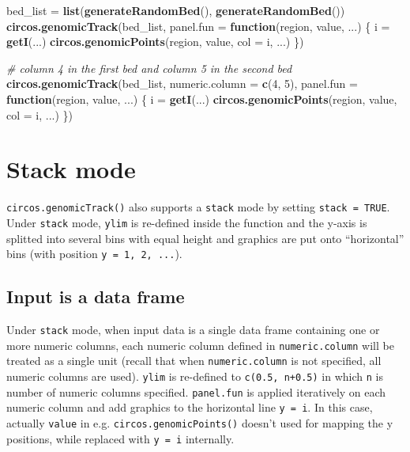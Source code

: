 \documentclass[]{book}
\newenvironment{Shaded}{\begin{snugshade}}{\end{snugshade}}
\newcommand{\KeywordTok}[1]{\textcolor[rgb]{0.13,0.29,0.53}{\textbf{#1}}}
\newcommand{\DataTypeTok}[1]{\textcolor[rgb]{0.13,0.29,0.53}{#1}}
\newcommand{\DecValTok}[1]{\textcolor[rgb]{0.00,0.00,0.81}{#1}}
\newcommand{\StringTok}[1]{\textcolor[rgb]{0.31,0.60,0.02}{#1}}
\newcommand{\CommentTok}[1]{\textcolor[rgb]{0.56,0.35,0.01}{\textit{#1}}}
\newcommand{\ControlFlowTok}[1]{\textcolor[rgb]{0.13,0.29,0.53}{\textbf{#1}}}
\newcommand{\NormalTok}[1]{#1}
\begin{document}
\begin{Shaded}
\begin{Highlighting}[]
\NormalTok{bed_list =}\StringTok{ }\KeywordTok{list}\NormalTok{(}\KeywordTok{generateRandomBed}\NormalTok{(), }\KeywordTok{generateRandomBed}\NormalTok{())}
\KeywordTok{circos.genomicTrack}\NormalTok{(bed_list,}
    \DataTypeTok{panel.fun =} \ControlFlowTok{function}\NormalTok{(region, value, ...) \{}
\NormalTok{        i =}\StringTok{ }\KeywordTok{getI}\NormalTok{(...)}
        \KeywordTok{circos.genomicPoints}\NormalTok{(region, value, }\DataTypeTok{col =}\NormalTok{ i, ...)}
\NormalTok{\})}

\CommentTok{# column 4 in the first bed and column 5 in the second bed}
\KeywordTok{circos.genomicTrack}\NormalTok{(bed_list, }\DataTypeTok{numeric.column =} \KeywordTok{c}\NormalTok{(}\DecValTok{4}\NormalTok{, }\DecValTok{5}\NormalTok{),}
    \DataTypeTok{panel.fun =} \ControlFlowTok{function}\NormalTok{(region, value, ...) \{}
\NormalTok{        i =}\StringTok{ }\KeywordTok{getI}\NormalTok{(...)}
        \KeywordTok{circos.genomicPoints}\NormalTok{(region, value, }\DataTypeTok{col =}\NormalTok{ i, ...)}
\NormalTok{\})}
\end{Highlighting}
\end{Shaded}

\section{Stack mode}\label{stack-mode}

\texttt{circos.genomicTrack()} also supports a \texttt{stack} mode by
setting \texttt{stack\ =\ TRUE}. Under \texttt{stack} mode,
\texttt{ylim} is re-defined inside the function and the y-axis is
splitted into several bins with equal height and graphics are put onto
``horizontal'' bins (with position \texttt{y\ =\ 1,\ 2,\ ...}).

\subsection{Input is a data frame}\label{input-is-a-data-frame-1}

Under \texttt{stack} mode, when input data is a single data frame
containing one or more numeric columns, each numeric column defined in
\texttt{numeric.column} will be treated as a single unit (recall that
when \texttt{numeric.column} is not specified, all numeric columns are
used). \texttt{ylim} is re-defined to \texttt{c(0.5,\ n+0.5)} in which
\texttt{n} is number of numeric columns specified. \texttt{panel.fun} is
applied iteratively on each numeric column and add graphics to the
horizontal line \texttt{y\ =\ i}. In this case, actually \texttt{value}
in e.g. \texttt{circos.genomicPoints()} doesn't used for mapping the y
positions, while replaced with \texttt{y\ =\ i} internally.
\end{document}
